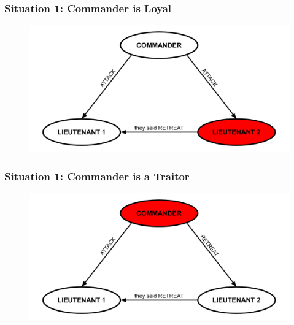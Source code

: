 \documentclass{beamer}
\theoremstyle{conjecture1}
\theoremstyle{conjecture2}
\begin{document}
\begin{frame}
    \frametitle{Situation 1: Commander is Loyal}
    \begin{figure}
        \centering
        \includegraphics[scale=.5]{../figures/three_generals_loyal_commander.pdf}
    \end{figure}
\end{frame}

\begin{frame}
    \frametitle{Situation 1: Commander is a Traitor}
    \begin{figure}
        \centering
        \includegraphics[scale=.5]{../figures/three_generals_unloyal_commander.pdf}
    \end{figure}
\end{frame}
\end{document}
